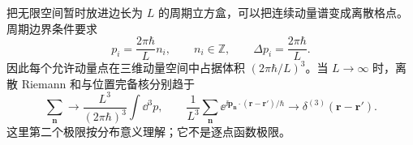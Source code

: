 
把无限空间暂时放进边长为 $L$ 的周期立方盒，可以把连续动量谱变成离散格点。周期边界条件要求
\begin{equation}
 \boxed{
 p_i=\frac{2\pi\hbar}{L}n_i,
 \qquad n_i\in\mathbb Z,
 \qquad
 \Delta p_i=\frac{2\pi\hbar}{L}.}
 \label{eq:periodic-box-momenta-dp68}
\end{equation}
因此每个允许动量点在三维动量空间中占据体积 $(2\pi\hbar/L)^3$。当 $L\to\infty$ 时，离散 Riemann 和与位置完备核分别趋于
\begin{equation}
\boxed{
\sum_{\mathbf n}\longrightarrow
\frac{L^3}{(2\pi\hbar)^3}\int\dd^3 p,
\qquad
\frac1{L^3}\sum_{\mathbf n}\ee^{\ii\mathbf p_{\mathbf n}\cdot(\mathbf r-\mathbf r')/\hbar}
\longrightarrow\delta^{(3)}(\mathbf r-\mathbf r').}
\label{eq:box-to-continuum-dp21}
\end{equation}
这里第二个极限按分布意义理解；它不是逐点函数极限。

